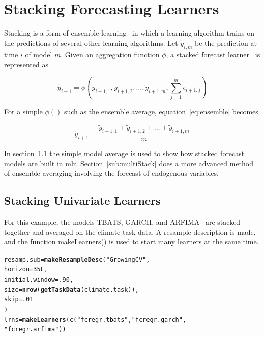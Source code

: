 \documentclass[12pt]{article}\usepackage[]{graphicx}\usepackage[]{color}
\makeatletter
\newcommand{\hlnum}[1]{\textcolor[rgb]{0.686,0.059,0.569}{#1}}%
\newcommand{\hlstr}[1]{\textcolor[rgb]{0.192,0.494,0.8}{#1}}%
\newcommand{\hlstd}[1]{\textcolor[rgb]{0.345,0.345,0.345}{#1}}%
\newcommand{\hlkwb}[1]{\textcolor[rgb]{0.69,0.353,0.396}{#1}}%
\newcommand{\hlkwc}[1]{\textcolor[rgb]{0.333,0.667,0.333}{#1}}%
\newcommand{\hlkwd}[1]{\textcolor[rgb]{0.737,0.353,0.396}{\textbf{#1}}}%
\newenvironment{kframe}{%
 \def\at@end@of@kframe{}%
 \ifinner\ifhmode%
  \def\at@end@of@kframe{\end{minipage}}%
  \begin{minipage}{\columnwidth}%
 \fi\fi%
 \def\FrameCommand##1{\hskip\@totalleftmargin \hskip-\fboxsep
 \colorbox{shadecolor}{##1}\hskip-\fboxsep
     \hskip-\linewidth \hskip-\@totalleftmargin \hskip\columnwidth}%
 \MakeFramed {\advance\hsize-\width
   \@totalleftmargin\z@ \linewidth\hsize
   \@setminipage}}%
 {\par\unskip\endMakeFramed%
 \at@end@of@kframe}
\newenvironment{knitrout}{}{} %
\theoremstyle{definition}
\newcommand\code{\@codex}
\def\@codex#1{{\normalfont\ttfamily\hyphenchar\font=-1 #1}}
\newcommand{\pkg}[1]{{\fontseries{b}\selectfont #1}}
\makeatother
\begin{document}
\section{Stacking Forecasting Learners}
\label{sec:stackfore}
Stacking is a form of ensemble learning~\cite{ensembleOverview} in which a learning algorithm trains on the predictions of several other learning algorithms. Let $\tilde{y}_{i,m}$ be the prediction at time $i$ of model $m$. Given an aggregation function $\phi$, a stacked forecast learner~\cite{combineForecast} is represented as

\begin{equation}
\tilde{y}_{i+1} = \phi(\tilde{y}_{i+1,1}, \tilde{y}_{i+1,2},\dots, \tilde{y}_{i+1,m}, \sum_{j=1}^m \epsilon_{i+1,j})
\label{eq:ensemble}
\end{equation}

For a simple $\phi()$ such as the ensemble average, equation~\ref{eq:ensemble} becomes

\begin{equation}
\tilde{y}_{i+1} = \frac{\tilde{y}_{i+1,1} + \tilde{y}_{i+1,2} +\dots + \tilde{y}_{i+1,m}}{m}
\label{eq:ensembleAverage}
\end{equation}

In section~\ref{sub:stackedUnivar} the simple model average is used to show how stacked forecast models are built in \pkg{mlr}. Section~\ref{sub:multiStack} does a more advanced method of ensemble averaging involving the forecast of endogenous variables.

\subsection{Stacking Univariate Learners}
\label{sub:stackedUnivar}

For this example, the models TBATS, GARCH, and ARFIMA~\cite{arfima} are stacked together and averaged on the climate task data. A resample description is made, and the function \code{makeLearners()} is used to start many learners at the same time.

\singlespacing
\begin{knitrout}
\color{fgcolor}\begin{kframe}
\begin{alltt}
\hlstd{resamp.sub} \hlkwb{=} \hlkwd{makeResampleDesc}\hlstd{(}\hlstr{"GrowingCV"}\hlstd{,}
                          \hlkwc{horizon} \hlstd{=} \hlnum{35L}\hlstd{,}
                          \hlkwc{initial.window} \hlstd{=} \hlnum{.90}\hlstd{,}
                          \hlkwc{size} \hlstd{=} \hlkwd{nrow}\hlstd{(}\hlkwd{getTaskData}\hlstd{(climate.task)),}
                          \hlkwc{skip} \hlstd{=} \hlnum{.01}
                          \hlstd{)}
\hlstd{lrns} \hlkwb{=} \hlkwd{makeLearners}\hlstd{(}\hlkwd{c}\hlstd{(}\hlstr{"fcregr.tbats"}\hlstd{,}\hlstr{"fcregr.garch"}\hlstd{,}
                      \hlstr{"fcregr.arfima"}\hlstd{))}
\end{alltt}
\end{kframe}
\end{knitrout}
\doublespacing
\end{document}
